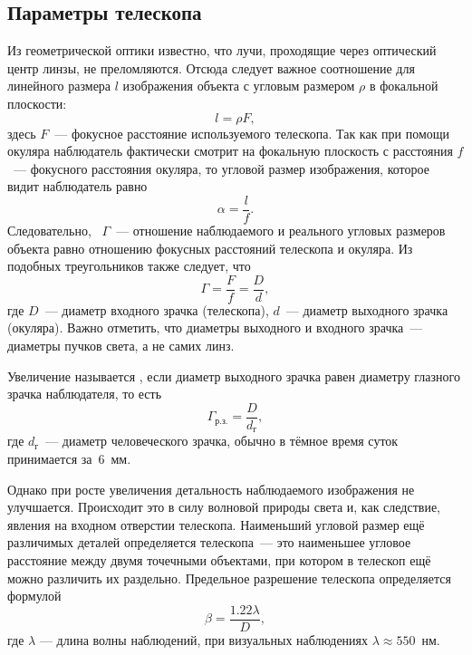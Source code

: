 \subsection{Параметры телескопа}
Из геометрической оптики известно, что лучи, проходящие через оптический центр линзы, не преломляются. Отсюда следует важное соотношение для линейного размера $l$ изображения объекта с угловым размером $\rho$ в фокальной плоскости:
\begin{equation}
	l = \rho F,
\end{equation}
здесь $F$~--- фокусное расстояние используемого телескопа.
Так как при помощи окуляра наблюдатель фактически смотрит на фокальную плоскость с расстояния $f$~--- фокусного расстояния окуляра, то угловой размер изображения, которое видит наблюдатель равно
\begin{equation}
	\alpha = \frac{l}{f}.
	\label{eq:zoom2}
\end{equation}
Следовательно, ~$\Gamma$~--- отношение наблюдаемого и реального угловых размеров объекта равно отношению фокусных расстояний телескопа и окуляра. Из подобных треугольников также следует, что
\begin{equation}
	\Gamma =\frac{F}{f} = \frac{D}{d},
	\label{eq:zoom1}
\end{equation}
где $D$~--- диаметр входного зрачка (телескопа), $d$~--- диаметр выходного зрачка (окуляра). Важно отметить, что диаметры выходного и входного зрачка~--- диаметры пучков света, а не самих линз.

Увеличение называется , если диаметр выходного зрачка равен диаметру глазного зрачка наблюдателя, то есть
\begin{equation}
	\Gamma_\text{р.з.} = \frac{D}{d_\text{г}},
\end{equation}
где $d_\text{г}$~--- диаметр человеческого зрачка, обычно в тёмное время суток принимается за~6~мм.

Однако при росте увеличения детальность наблюдаемого изображения не улучшается. Происходит это в силу волновой природы света и, как следствие, явления  на входном отверстии телескопа. Наименьший угловой размер ещё различимых деталей определяется  телескопа~--- это наименьшее угловое расстояние между двумя точечными объектами, при котором в телескоп ещё можно различить их раздельно. Предельное разрешение телескопа определяется формулой
\begin{equation}
	\beta = \frac{1.22\lambda}{D},
\end{equation}
где $\lambda$ --- длина волны наблюдений, при визуальных наблюдениях $\lambda \approx 550$~нм.

